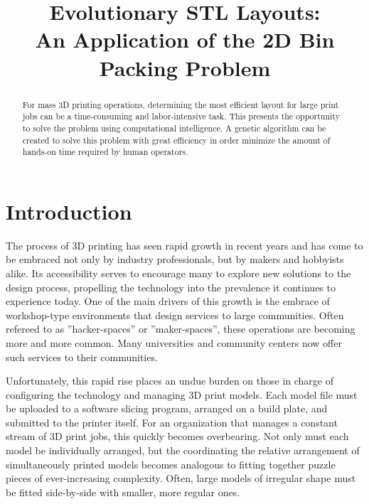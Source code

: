 \documentclass[conference]{IEEEtran}
\begin{document}
\title{Evolutionary STL Layouts:\\An Application of the 2D Bin Packing Problem}
\author{
}

\maketitle

\begin{abstract}
For mass 3D printing operations, determining the most efficient layout for large print jobs can be a time-consuming and labor-intensive task. This presents the opportunity to solve the problem using computational intelligence. A genetic algorithm can be created to solve this problem with great efficiency in order minimize the amount of hands-on time required by human operators.
\end{abstract}

\section{Introduction}
The process of 3D printing has seen rapid growth in recent years and has come to be embraced not only by industry professionals, but by makers and hobbyists alike. Its accessibility serves to encourage many to explore new solutions to the design process, propelling the technology into the prevalence it continues to experience today. One of the main drivers of this growth is the embrace of workshop-type environments that design services to large communities. Often refereed to as ”hacker-spaces” or ”maker-spaces”, these operations are becoming more and more common. Many universities \cite{3d_printing_mst} and community centers \cite{3d_printing_joco} now offer such services to their communities.

Unfortunately, this rapid rise places an undue burden on those in charge of configuring the technology and managing 3D print models. Each model file must be uploaded to a software slicing program, arranged on a build plate, and submitted to the printer itself. For an organization that manages a constant stream of 3D print jobs, this quickly becomes overbearing. Not only must each model be individually arranged, but the coordinating the relative arrangement of simultaneously printed models becomes analogous to fitting together puzzle pieces of ever-increasing complexity. Often, large models of irregular shape must be fitted side-by-side with smaller, more regular ones.
\end{document}
